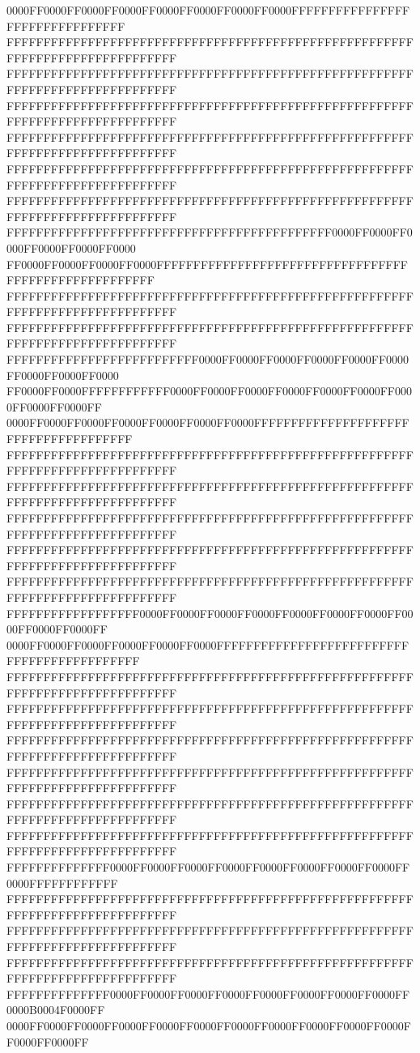 0000FF0000FF0000FF0000FF0000FF0000FF0000FF0000FFFFFFFFFFFFFFFFFFFFFFFFFFFFFFFF
FFFFFFFFFFFFFFFFFFFFFFFFFFFFFFFFFFFFFFFFFFFFFFFFFFFFFFFFFFFFFFFFFFFFFFFFFFFFFF
FFFFFFFFFFFFFFFFFFFFFFFFFFFFFFFFFFFFFFFFFFFFFFFFFFFFFFFFFFFFFFFFFFFFFFFFFFFFFF
FFFFFFFFFFFFFFFFFFFFFFFFFFFFFFFFFFFFFFFFFFFFFFFFFFFFFFFFFFFFFFFFFFFFFFFFFFFFFF
FFFFFFFFFFFFFFFFFFFFFFFFFFFFFFFFFFFFFFFFFFFFFFFFFFFFFFFFFFFFFFFFFFFFFFFFFFFFFF
FFFFFFFFFFFFFFFFFFFFFFFFFFFFFFFFFFFFFFFFFFFFFFFFFFFFFFFFFFFFFFFFFFFFFFFFFFFFFF
FFFFFFFFFFFFFFFFFFFFFFFFFFFFFFFFFFFFFFFFFFFFFFFFFFFFFFFFFFFFFFFFFFFFFFFFFFFFFF
FFFFFFFFFFFFFFFFFFFFFFFFFFFFFFFFFFFFFFFFFFFF0000FF0000FF0000FF0000FF0000FF0000
FF0000FF0000FF0000FF0000FFFFFFFFFFFFFFFFFFFFFFFFFFFFFFFFFFFFFFFFFFFFFFFFFFFFFF
FFFFFFFFFFFFFFFFFFFFFFFFFFFFFFFFFFFFFFFFFFFFFFFFFFFFFFFFFFFFFFFFFFFFFFFFFFFFFF
FFFFFFFFFFFFFFFFFFFFFFFFFFFFFFFFFFFFFFFFFFFFFFFFFFFFFFFFFFFFFFFFFFFFFFFFFFFFFF
FFFFFFFFFFFFFFFFFFFFFFFFFF0000FF0000FF0000FF0000FF0000FF0000FF0000FF0000FF0000
FF0000FF0000FFFFFFFFFFFF0000FF0000FF0000FF0000FF0000FF0000FF0000FF0000FF0000FF
0000FF0000FF0000FF0000FF0000FF0000FF0000FFFFFFFFFFFFFFFFFFFFFFFFFFFFFFFFFFFFFF
FFFFFFFFFFFFFFFFFFFFFFFFFFFFFFFFFFFFFFFFFFFFFFFFFFFFFFFFFFFFFFFFFFFFFFFFFFFFFF
FFFFFFFFFFFFFFFFFFFFFFFFFFFFFFFFFFFFFFFFFFFFFFFFFFFFFFFFFFFFFFFFFFFFFFFFFFFFFF
FFFFFFFFFFFFFFFFFFFFFFFFFFFFFFFFFFFFFFFFFFFFFFFFFFFFFFFFFFFFFFFFFFFFFFFFFFFFFF
FFFFFFFFFFFFFFFFFFFFFFFFFFFFFFFFFFFFFFFFFFFFFFFFFFFFFFFFFFFFFFFFFFFFFFFFFFFFFF
FFFFFFFFFFFFFFFFFFFFFFFFFFFFFFFFFFFFFFFFFFFFFFFFFFFFFFFFFFFFFFFFFFFFFFFFFFFFFF
FFFFFFFFFFFFFFFFFF0000FF0000FF0000FF0000FF0000FF0000FF0000FF0000FF0000FF0000FF
0000FF0000FF0000FF0000FF0000FF0000FFFFFFFFFFFFFFFFFFFFFFFFFFFFFFFFFFFFFFFFFFFF
FFFFFFFFFFFFFFFFFFFFFFFFFFFFFFFFFFFFFFFFFFFFFFFFFFFFFFFFFFFFFFFFFFFFFFFFFFFFFF
FFFFFFFFFFFFFFFFFFFFFFFFFFFFFFFFFFFFFFFFFFFFFFFFFFFFFFFFFFFFFFFFFFFFFFFFFFFFFF
FFFFFFFFFFFFFFFFFFFFFFFFFFFFFFFFFFFFFFFFFFFFFFFFFFFFFFFFFFFFFFFFFFFFFFFFFFFFFF
FFFFFFFFFFFFFFFFFFFFFFFFFFFFFFFFFFFFFFFFFFFFFFFFFFFFFFFFFFFFFFFFFFFFFFFFFFFFFF
FFFFFFFFFFFFFFFFFFFFFFFFFFFFFFFFFFFFFFFFFFFFFFFFFFFFFFFFFFFFFFFFFFFFFFFFFFFFFF
FFFFFFFFFFFFFFFFFFFFFFFFFFFFFFFFFFFFFFFFFFFFFFFFFFFFFFFFFFFFFFFFFFFFFFFFFFFFFF
FFFFFFFFFFFFFF0000FF0000FF0000FF0000FF0000FF0000FF0000FF0000FF0000FFFFFFFFFFFF
FFFFFFFFFFFFFFFFFFFFFFFFFFFFFFFFFFFFFFFFFFFFFFFFFFFFFFFFFFFFFFFFFFFFFFFFFFFFFF
FFFFFFFFFFFFFFFFFFFFFFFFFFFFFFFFFFFFFFFFFFFFFFFFFFFFFFFFFFFFFFFFFFFFFFFFFFFFFF
FFFFFFFFFFFFFFFFFFFFFFFFFFFFFFFFFFFFFFFFFFFFFFFFFFFFFFFFFFFFFFFFFFFFFFFFFFFFFF
FFFFFFFFFFFFFF0000FF0000FF0000FF0000FF0000FF0000FF0000FF0000FF0000B0004F0000FF
0000FF0000FF0000FF0000FF0000FF0000FF0000FF0000FF0000FF0000FF0000FF0000FF0000FF
